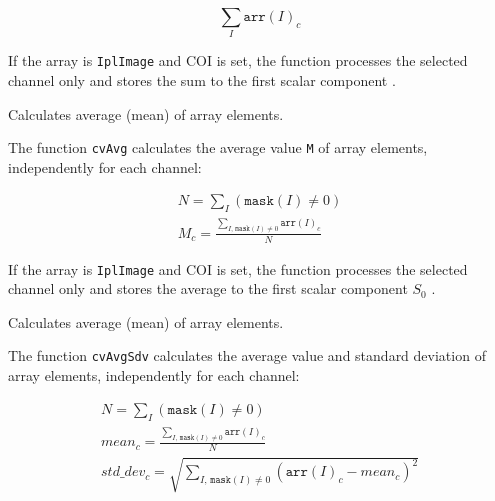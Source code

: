 \[ \sum_I \texttt{arr}(I)_c \]

If the array is \texttt{IplImage} and COI is set, the function processes the selected channel only and stores the sum to the first scalar component
.


\label{Avg}

Calculates average (mean) of array elements.


\begin{description}
\end{description}


The function \texttt{cvAvg} calculates the average value \texttt{M} of array elements, independently for each channel:

\[
\begin{array}{l}
N = \sum_I (\texttt{mask}(I) \ne 0)\\
M_c = \frac{\sum_{ I, \, \texttt{mask}(I) \ne 0} \texttt{arr}(I)_c}{N}
\end{array}
\]

If the array is \texttt{IplImage} and COI is set, the function processes the selected channel only and stores the average to the first scalar component $ S_0 $ .

\label{AvgSdv}

Calculates average (mean) of array elements.


\begin{description}
\end{description}

The function \texttt{cvAvgSdv} calculates the average value and standard deviation of array elements, independently for each channel:

\[
\begin{array}{l}
N = \sum_I (\texttt{mask}(I) \ne 0)\\
mean_c = \frac{\sum_{ I, \, \texttt{mask}(I) \ne 0} \texttt{arr}(I)_c}{N}\\
std\_dev_c = \sqrt{\sum_{ I, \, \texttt{mask}(I) \ne 0} (\texttt{arr}(I)_c - mean_c)^2}
\end{array}
\]

